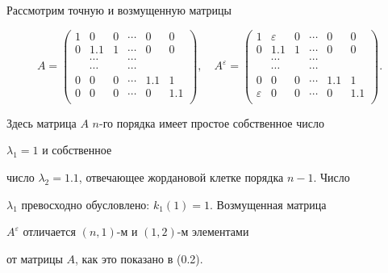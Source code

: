 \begin{exam}


Рассмотрим точную и возмущенную матрицы


\begin{equation}


A=\begin{pmatrix}


1 & 0 & 0 & \dotsb & 0 & 0 \\


0 & 1.1 & 1 & \dotsb & 0 & 0 \\


 & \dotsb &  & \dotsb &  &  \\


 & \dotsb &  & \dotsb &  &  \\


0 & 0 & 0 & \dotsb & 1.1 & 1 \\


0 & 0 & 0 & \dotsb & 0 & 1.1\\


\end{pmatrix},\quad


A^{\varepsilon}=\begin{pmatrix}


1 & \varepsilon & 0 & \dotsb & 0 & 0 \\


0 & 1.1 & 1 & \dotsb & 0 & 0 \\


 & \dotsb &  & \dotsb &  &  \\


 & \dotsb &  & \dotsb &  &  \\


0 & 0 & 0 & \dotsb & 1.1 & 1 \\


\varepsilon & 0 & 0 & \dotsb & 0 & 1.1\\


\end{pmatrix}.\tag{0.2}


\end{equation}


Здесь матрица $A$\; $n$-го порядка имеет простое собственное число


$\lambda_1=1$ и собственное


число $\lambda_2=1.1$, отвечающее жордановой клетке порядка $n-1$. Число


$\lambda_1$ превосходно обусловлено: $k_1(1)=1$. Возмущенная матрица


$A^{\varepsilon}$ отличается $(n,1)$-м и $(1,2)$-м элементами


от матрицы $A$, как это показано в (0.2).


\end{exam}





